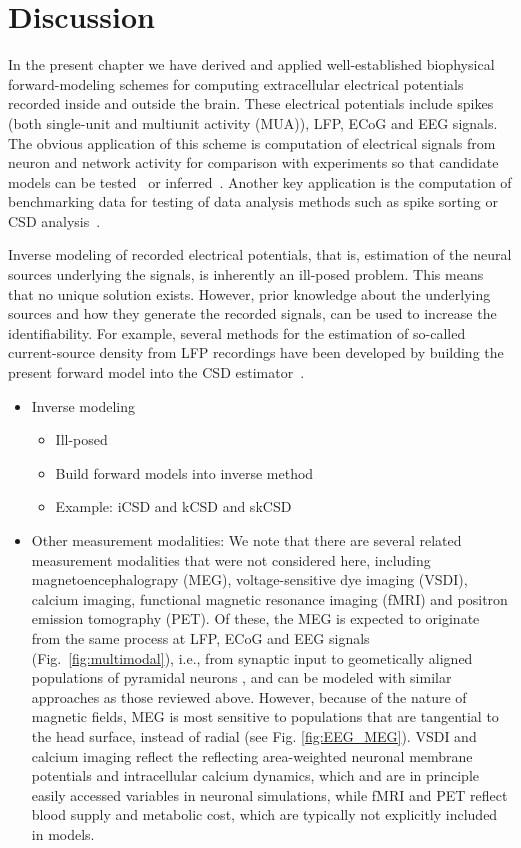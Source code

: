 \documentclass[preprint,11pt,authoryear]{elsarticle}
\begin{document}
\section{Discussion}
\label{sec:summary}

In the present chapter we have derived and applied well-established biophysical forward-modeling schemes for computing extracellular electrical potentials recorded inside and outside the brain. These electrical potentials include spikes (both single-unit and multiunit activity (MUA)), LFP, ECoG and EEG signals. The obvious application of this scheme is computation of electrical signals from neuron and network activity for comparison with experiments so that candidate models can be tested~\citep{Einevoll2019} or inferred~\citep{Goncalves2019,Skaar2020}.
Another key application is the computation of benchmarking data for testing of data analysis methods such as 
spike sorting or CSD analysis~\citep{Denker2012}. 

Inverse modeling of recorded electrical potentials, that is, estimation of the neural sources underlying the signals, is inherently an ill-posed problem. This means that no unique solution exists. However, prior knowledge about the underlying sources and how they generate the recorded signals, can be used to increase the identifiability. For example, several methods for the estimation of so-called current-source density from LFP recordings have been developed by building the present forward model into the CSD 
estimator~\citep{Pettersen2006,Potworowski2012,Cserpan2017}.

 

\begin{itemize}
\item Inverse modeling 
\begin{itemize}
\item Ill-posed
\item Build forward models into inverse method
\item Example: iCSD and kCSD and skCSD
\end{itemize}
\item Other measurement modalities: 
We note that there are several related measurement modalities that were not considered here, including magnetoencephalograpy (MEG), voltage-sensitive dye imaging (VSDI), calcium imaging, functional magnetic resonance imaging (fMRI) and positron emission tomography (PET). Of these, the MEG is expected to originate from the same process at LFP, ECoG and EEG signals (Fig.~\ref{fig:multimodal}), i.e., from synaptic input to geometically aligned populations of pyramidal neurons \citep{Hamalainen1993}, and can be modeled with similar approaches as those reviewed above. However, because of the nature of magnetic fields, MEG is most sensitive to populations that are tangential to the head surface, instead of radial (see Fig. \ref{fig:EEG_MEG}). VSDI and calcium imaging reflect the reflecting area-weighted neuronal membrane potentials and intracellular calcium dynamics, which and are in principle easily accessed variables in neuronal simulations, while fMRI and PET reflect blood supply and metabolic cost, which are typically not explicitly included in models. 
\end{itemize}
\end{document}
